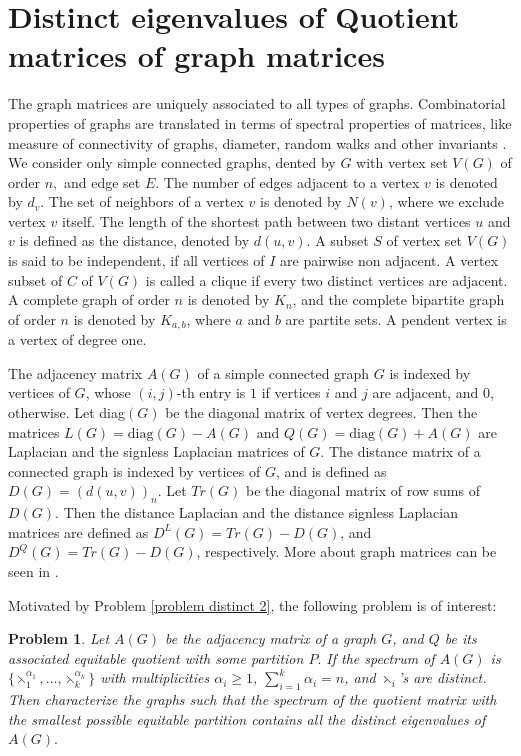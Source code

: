 \documentclass[12pt,twoside]{article}
\newtheorem{problem}{Problem}
\begin{document}
\section{Distinct eigenvalues of Quotient matrices of graph matrices}\label{section 5}
The graph matrices are uniquely associated to all types of graphs. Combinatorial properties of graphs are translated in terms of spectral properties of matrices, like measure of connectivity  of graphs, diameter, random walks and other invariants \cite{cds,BH}. We consider only simple connected graphs, dented by $G$ with vertex set $V(G)$ of order $n,$ and edge set $E.$ The number of edges adjacent to a vertex $v$ is denoted by $d_{v}$. The set of neighbors of a vertex $v$ is denoted by $N(v)$, where we exclude vertex $v$ itself.  
The length of the shortest path between two distant vertices $u$ and $v$ is defined as the distance, denoted by $d(u,v).$ A subset $S$ of vertex set $V(G)$ is said to be independent, if all vertices of $I$ are pairwise non adjacent. A vertex subset of $C$ of $V(G)$ is called a clique if every two distinct vertices are adjacent. A complete graph of order $n$ is denoted by $K_{n}$, and the complete bipartite graph of order $n$ is denoted by $K_{a,b}$, where $a$ and $b$ are partite sets. A pendent vertex is a vertex of degree one.

The adjacency matrix $A(G)$ of a simple connected graph $G$ is indexed by vertices of $G$, whose $(i,j)$-th entry is $1$ if vertices $i$ and $j$ are adjacent,  and $0$, otherwise.  Let diag$(G)$ be the diagonal matrix of vertex degrees. Then the matrices $L(G)=\text{diag}(G)-A(G)$ and $Q(G)=\text{diag}(G)+A(G)$ are Laplacian and the signless Laplacian matrices of $G.$ The distance matrix of a connected graph is indexed by vertices  of $G$, and is defined as $D(G)=(d(u,v))_{n}$. Let $Tr(G)$ be the diagonal matrix of row sums of $D(G)$. Then the distance Laplacian and the distance signless Laplacian matrices are defined as $D^{L}(G)=Tr(G)-D(G)$, and $D^{Q}(G)=Tr(G)-D(G)$, respectively. More about graph matrices can be seen in \cite{bilallapsurvey,bilalslapsurvey,cds, bilalmath}.


Motivated by Problem \ref{problem distinct 2}, the following problem is of interest:
\begin{problem}\label{problem distinct 4}
	Let $A(G)$ be the adjacency matrix of a graph $G$, and $Q$ be its associated equitable quotient with some partition $P.$ If the spectrum of $A(G)$ is $\{\leftthreetimes_{1}^{\alpha_{1}},\dots,\leftthreetimes_{k}^{\alpha_{k}}\}$ with multiplicities $\alpha_{i}\geq 1$, $\sum_{i=1}^{k}\alpha_{i}=n$, and $\leftthreetimes_{i}$'s are distinct. Then characterize the graphs such that the spectrum of the quotient matrix with the smallest possible equitable partition contains all the distinct eigenvalues of $A(G).$
\end{problem}
\end{document}
